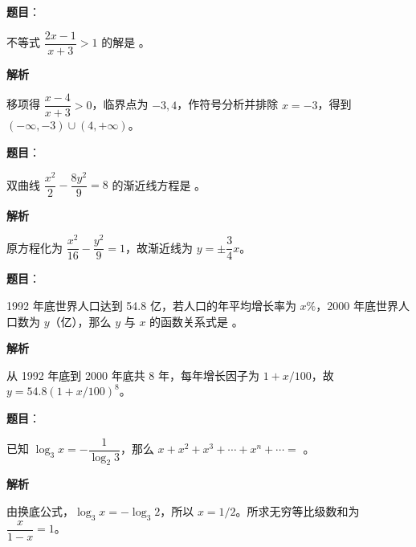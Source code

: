 \begin{answer}

\textbf{题目}：

不等式 $\dfrac{2x-1}{x+3}>1$ 的解是 \gkblank{}。

\textbf{解析}

移项得 $\dfrac{x-4}{x+3}>0$，临界点为 $-3,4$，作符号分析并排除 $x=-3$，得到 $(-\infty,-3)\cup(4,+\infty)$。


\end{answer}
\begin{answer}

\textbf{题目}：

双曲线 $\dfrac{x^2}{2}-\dfrac{8y^2}{9}=8$ 的渐近线方程是 \gkblank{}。

\textbf{解析}

原方程化为 $\dfrac{x^2}{16}-\dfrac{y^2}{9}=1$，故渐近线为 $y=\pm\dfrac34x$。


\end{answer}
\begin{answer}

\textbf{题目}：

1992 年底世界人口达到 54.8 亿，若人口的年平均增长率为 $x\%$，2000 年底世界人口数为 $y$（亿），那么 $y$ 与 $x$ 的函数关系式是 \gkblank{}。

\textbf{解析}

从 1992 年底到 2000 年底共 8 年，每年增长因子为 $1+x/100$，故 $y=54.8(1+x/100)^8$。


\end{answer}
\begin{answer}

\textbf{题目}：

已知 $\log_3x=-\dfrac1{\log_2 3}$，那么 $x+x^2+x^3+\cdots+x^n+\cdots=$ \gkblank{}。

\textbf{解析}

由换底公式，$\log_3x=-\log_3 2$，所以 $x=1/2$。所求无穷等比级数和为 $\dfrac{x}{1-x}=1$。


\end{answer}

